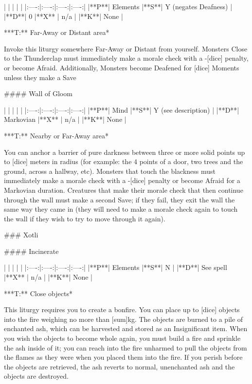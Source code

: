 | | | | |
|:----:|:----:|:----:|:----:|
|**P**| Elements |**S**|  Y (negates Deafness) |
|**D**| 0 |**X** |  n/a  |
|**K**| None |


***T:**   Far-Away or Distant area*



Invoke this liturgy somewhere Far-Away or Distant from yourself.  Monsters Close to the Thunderclap must immediately make a morale check with a -[dice] penalty, or become Afraid.  Additionally, Monsters become Deafened for [dice] Moments unless they make a Save





#### Wall of Gloom

| | | | |
|:----:|:----:|:----:|:----:|
|**P**| Mind |**S**|  Y (see description) |
|**D**| Markovian |**X** |  n/a  |
|**K**| None |


***T:**   Nearby or Far-Away area*



You can anchor a barrier of pure darkness between three or more solid points up to [dice] meters in radius (for example: the 4 points of a door, two trees and the ground, across a hallway, etc).  Monsters that touch the blackness must immediately make a morale check with a -[dice] penalty or become Afraid for a Markovian duration.  Creatures that make their morale check that then continue through the wall must make a second Save; if they fail, they exit the wall the same way they came in (they will need to make a morale check again to touch the wall if they wish to try to move through it again).   


### Xotli





#### Incinerate

| | | | |
|:----:|:----:|:----:|:----:|
|**P**| Elements |**S**|  N |
|**D**| See spell |**X** |  n/a  |
|**K**| None |


***T:**   Close objects*



This liturgy requires you to create a bonfire.  You can place up to [dice] objects into the fire weighing no more than [sum]kg.  The objects are burned to a pile of enchanted ash, which can be harvested and stored as an Insignificant item.  When you wish the objects to become whole again, you must build a fire and sprinkle the ash inside of it; you can reach into the fire unharmed to pull the objects from the flames as they were when you placed them into the fire.  If you perish before the objects are retrieved, the ash reverts to normal, unenchanted ash and the objects are destroyed.





